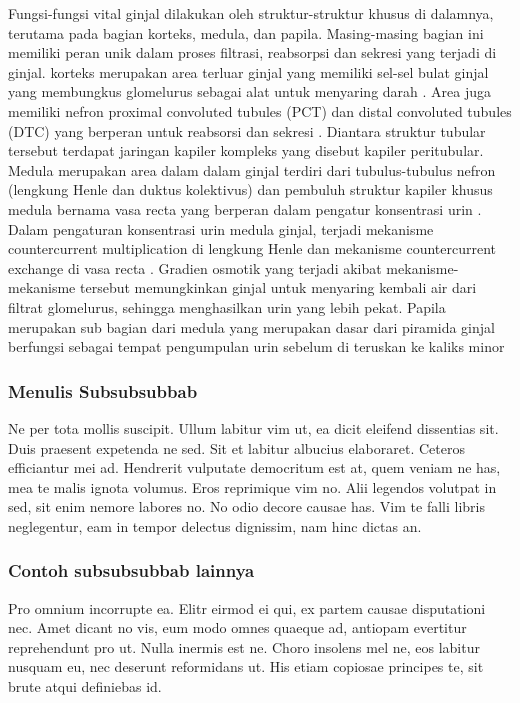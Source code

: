 \noindent Fungsi-fungsi vital ginjal dilakukan oleh struktur-struktur khusus di dalamnya, terutama pada bagian korteks, medula, dan papila. Masing-masing bagian ini memiliki peran unik dalam proses filtrasi, reabsorpsi dan sekresi yang terjadi di ginjal. korteks merupakan area terluar ginjal yang memiliki sel-sel bulat ginjal yang membungkus glomelurus sebagai alat untuk menyaring darah \cite{gopalan_renal_2022}. Area juga memiliki nefron proximal convoluted tubules (PCT) dan distal convoluted tubules (DTC) yang berperan untuk reabsorsi dan sekresi \cite{mescher_junqueiras_2021}. Diantara struktur tubular tersebut terdapat jaringan kapiler kompleks yang disebut kapiler peritubular.  Medula merupakan area dalam dalam ginjal terdiri dari tubulus-tubulus nefron (lengkung Henle dan duktus kolektivus) dan pembuluh struktur kapiler khusus medula bernama vasa recta yang berperan dalam pengatur konsentrasi urin \cite{haug_multi-omic_2022}. Dalam pengaturan konsentrasi urin medula ginjal, terjadi mekanisme countercurrent multiplication di lengkung Henle dan mekanisme countercurrent exchange di vasa recta \cite{nankivell_importance_2020}. Gradien osmotik yang terjadi akibat mekanisme-mekanisme tersebut memungkinkan ginjal untuk menyaring kembali air dari filtrat glomelurus, sehingga menghasilkan urin yang lebih pekat. Papila merupakan sub bagian dari medula yang merupakan dasar dari piramida ginjal berfungsi sebagai tempat pengumpulan urin sebelum di teruskan ke kaliks minor \cite{sabate_arroyo_relationship_2020}


\subsubsection{Menulis Subsubsubbab}
Ne per tota mollis suscipit. Ullum labitur vim ut, ea dicit eleifend dissentias sit. Duis praesent expetenda ne sed. Sit et labitur albucius elaboraret. Ceteros efficiantur mei ad. Hendrerit vulputate democritum est at, quem veniam ne has, mea te malis ignota volumus. Eros reprimique vim no. Alii legendos volutpat in sed, sit enim nemore labores no. No odio decore causae has. Vim te falli libris neglegentur, eam in tempor delectus dignissim, nam hinc dictas an.

\subsubsection{Contoh subsubsubbab lainnya}
Pro omnium incorrupte ea. Elitr eirmod ei qui, ex partem causae disputationi nec. Amet dicant no vis, eum modo omnes quaeque ad, antiopam evertitur reprehendunt pro ut. Nulla inermis est ne. Choro insolens mel ne, eos labitur nusquam eu, nec deserunt reformidans ut. His etiam copiosae principes te, sit brute atqui definiebas id.



